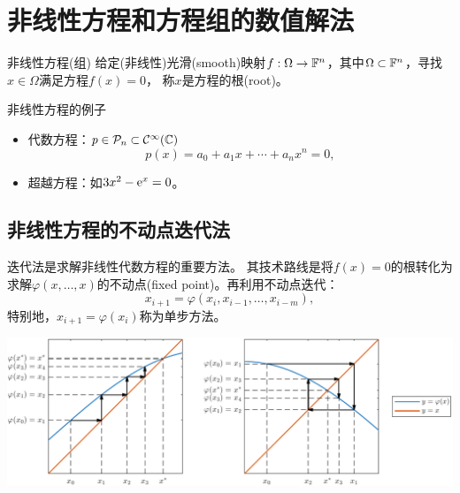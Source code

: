 \chapter{非线性方程和方程组的数值解法}

\begin{definition}
    {非线性方程(组)}{}
    给定(非线性)光滑(smooth)映射$f:\Omega\to\mathbb F^n$，其中$\Omega\subset\mathbb F^n$，寻找$x\in\Omega$满足方程$f(x)=0$，
    称$x$是方程的根(root)。
\end{definition}


\begin{example}
    {非线性方程的例子}{}
    \begin{itemize}
        \item 代数方程：$p\in\mathcal P_n\subset\mathcal C^\infty(\mathbb C)$
        \[
            p(x)=a_0+a_1x+\cdots+a_nx^n=0,
        \]
        \item 超越方程：如$3x^2-\mathop{}\!\mathrm{e}^ x=0$。
    \end{itemize}
\end{example}

\section{非线性方程的不动点迭代法}

迭代法是求解非线性代数方程的重要方法。
其技术路线是将$f(x)=0$的根转化为求解$\varphi(x,\ldots,x)$的不动点(fixed point)。再利用不动点迭代：
\begin{equation}
    x_{i+1}=\varphi(x_i,x_{i-1},\ldots,x_{i-m}),
\end{equation}
特别地，$x_{i+1}=\varphi(x_i)$称为单步方法。
\begin{center}
    \includegraphics[width=0.95\linewidth]{figures/fixpoint.pdf}
    \label{fig:fixpoint}
\end{center}

